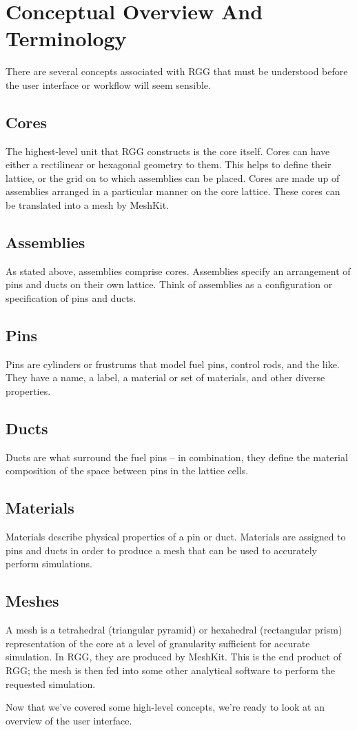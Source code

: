 \section{Conceptual Overview And Terminology}

There are several concepts associated with RGG that must be understood before the user interface or workflow will seem sensible.

\subsection{Cores}
The highest-level unit that RGG constructs is the core itself.  Cores can have either a rectilinear or hexagonal geometry to them.  This helps to define their lattice, or the grid on to which assemblies can be placed.  Cores are made up of assemblies arranged in a particular manner on the core lattice.  These cores can be translated into a mesh by MeshKit.

\subsection{Assemblies}
As stated above, assemblies comprise cores.  Assemblies specify an arrangement of pins and ducts on their own lattice.  Think of assemblies as a configuration or specification of pins and ducts.

\subsection{Pins}
Pins are cylinders or frustrums that model fuel pins, control rods, and the like.  They have a name, a label, a material or set of materials, and other diverse properties.

\subsection{Ducts}
Ducts are what surround the fuel pins -- in combination, they define the material composition of the space between pins in the lattice cells.

\subsection{Materials}
Materials describe physical properties of a pin or duct.  Materials are assigned to pins and ducts in order to produce a mesh that can be used to accurately perform simulations.

\subsection{Meshes}
A mesh is a tetrahedral (triangular pyramid) or hexahedral (rectangular prism) representation of the core at a level of granularity sufficient for accurate simulation.  In RGG, they are produced by MeshKit.  This is the end product of RGG; the mesh is then fed into some other analytical software to perform the requested simulation.

Now that we've covered some high-level concepts, we're ready to look at an overview of the user interface.